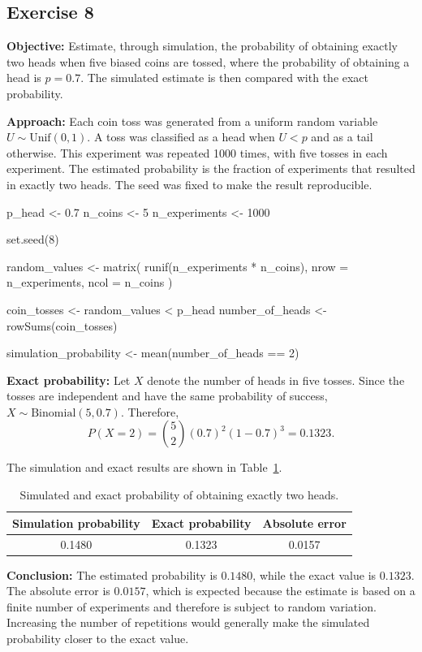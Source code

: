 \documentclass[12pt]{article}
\begin{document}
\subsection{Exercise 8}

\textbf{Objective:} Estimate, through simulation, the probability of obtaining exactly two heads when five biased coins are tossed, where the probability of obtaining a head is $p=0.7$. The simulated estimate is then compared with the exact probability.

\textbf{Approach:} Each coin toss was generated from a uniform random variable $U \sim \mathrm{Unif}(0,1)$. A toss was classified as a head when $U < p$ and as a tail otherwise. This experiment was repeated 1000 times, with five tosses in each experiment. The estimated probability is the fraction of experiments that resulted in exactly two heads. The seed was fixed to make the result reproducible.

\begin{configbox}
p_head <- 0.7
n_coins <- 5
n_experiments <- 1000

set.seed(8)

random_values <- matrix(
    runif(n_experiments * n_coins),
    nrow = n_experiments,
    ncol = n_coins
)

coin_tosses <- random_values < p_head
number_of_heads <- rowSums(coin_tosses)

simulation_probability <- mean(number_of_heads == 2)
\end{configbox}

\textbf{Exact probability:} Let $X$ denote the number of heads in five tosses. Since the tosses are independent and have the same probability of success, $X \sim \mathrm{Binomial}(5,0.7)$. Therefore,
\[
P(X=2) = \binom{5}{2}(0.7)^2(1-0.7)^3 = 0.1323.
\]

The simulation and exact results are shown in Table~\ref{tab:ex8_results}.

\begin{table}[H]
\centering
\begin{tabular}{|c|c|c|}
\hline
Simulation probability & Exact probability & Absolute error \\
\hline
0.1480 & 0.1323 & 0.0157 \\
\hline
\end{tabular}
\caption{Simulated and exact probability of obtaining exactly two heads.}
\label{tab:ex8_results}
\end{table}

\textbf{Conclusion:} The estimated probability is $0.1480$, while the exact value is $0.1323$. The absolute error is $0.0157$, which is expected because the estimate is based on a finite number of experiments and therefore is subject to random variation. Increasing the number of repetitions would generally make the simulated probability closer to the exact value.
\end{document}
